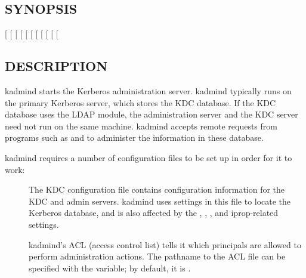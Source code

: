 \documentclass[letterpaper,10pt,english]{sphinxmanual}
\begin{document}
\subsection{SYNOPSIS}
\label{\detokenize{admin/admin_commands/kadmind:synopsis}}
{[} \sphinxstyleemphasis{db\_args}{]}
{[} \sphinxstyleemphasis{realm}{]}
{[}\sphinxstylestrong{-m}{]}
{[}\sphinxstylestrong{-nofork}{]}
{[}\sphinxstylestrong{-proponly}{]}
{[} \sphinxstyleemphasis{port-number}{]}
{[} \sphinxstyleemphasis{pid\_file}{]}
{[} \sphinxstyleemphasis{kdb5\_util\_path}{]}
{[} \sphinxstyleemphasis{kprop\_path}{]}
{[} \sphinxstyleemphasis{kprop\_port}{]}
{[} \sphinxstyleemphasis{dump\_file}{]}


\subsection{DESCRIPTION}
\label{\detokenize{admin/admin_commands/kadmind:description}}
kadmind starts the Kerberos administration server.  kadmind typically
runs on the primary Kerberos server, which stores the KDC database.
If the KDC database uses the LDAP module, the administration server
and the KDC server need not run on the same machine.  kadmind accepts
remote requests from programs such as {\hyperref[\detokenize{admin/admin_commands/kadmin_local:kadmin-1}]{}} and
 to administer the information in these database.

kadmind requires a number of configuration files to be set up in order
for it to work:
\begin{description}
\item[{{\hyperref[\detokenize{admin/conf_files/kdc_conf:kdc-conf-5}]{}}}] \leavevmode
The KDC configuration file contains configuration information for
the KDC and admin servers.  kadmind uses settings in this file to
locate the Kerberos database, and is also affected by the
, , , and iprop-related
settings.

\item[{{\hyperref[\detokenize{admin/conf_files/kadm5_acl:kadm5-acl-5}]{}}}] \leavevmode
kadmind’s ACL (access control list) tells it which principals are
allowed to perform administration actions.  The pathname to the
ACL file can be specified with the  {\hyperref[\detokenize{admin/conf_files/kdc_conf:kdc-conf-5}]{}}
variable; by default, it is {\hyperref[\detokenize{mitK5defaults:paths}]{}}.

\end{description}
\end{document}
